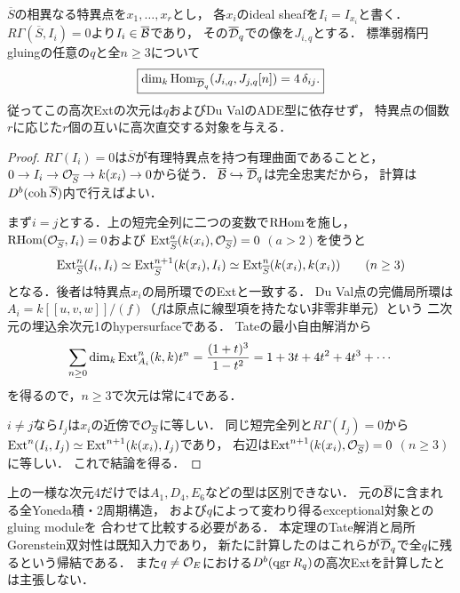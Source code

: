 \begin{theorem}[Du Val点の高次Extの一様性]\label{thm:duval-high-ext}
$\overline S$の相異なる特異点を$x_1,\ldots,x_r$とし，
各$x_i$のideal sheafを$I_i=I_{x_i}$と書く．
$R\Gamma(\overline S,I_i)=0$より$I_i\in\overline{\mathcal B}$であり，
その$\overline{\mathcal D}_q$での像を$J_{i,q}$とする．
標準弱楕円gluingの任意の$q$と全$n\ge3$について
\[
\boxed{\dim_k\operatorname{Hom}_{\overline{\mathcal D}_q}(J_{i,q},J_{j,q}[n])
 =4\,\delta_{ij}.}
\]
従ってこの高次Extの次元は$q$およびDu ValのADE型に依存せず，
特異点の個数$r$に応じた$r$個の互いに高次直交する対象を与える．
\end{theorem}
\begin{proof}
$R\Gamma(I_i)=0$は$\overline S$が有理特異点を持つ有理曲面であることと，
$0\to I_i\to\mathcal O_{\overline S}\to k(x_i)\to0$から従う．
$\overline{\mathcal B}\hookrightarrow\overline{\mathcal D}_q$は完全忠実だから，
計算は$D^b(\operatorname{coh}\overline S)$内で行えばよい．

まず$i=j$とする．上の短完全列に二つの変数で$\operatorname{RHom}$を施し，
$\operatorname{RHom}(\mathcal O_{\overline S},I_i)=0$および
$\operatorname{Ext}_{\overline S}^a(k(x_i),\mathcal O_{\overline S})=0$ $(a>2)$を使うと
\[
 \operatorname{Ext}^n_{\overline S}(I_i,I_i)
 \simeq\operatorname{Ext}^{n+1}_{\overline S}(k(x_i),I_i)
 \simeq\operatorname{Ext}^n_{\overline S}(k(x_i),k(x_i))
 \qquad(n\ge3)
\]
となる．後者は特異点$x_i$の局所環でのExtと一致する．
Du Val点の完備局所環は
$A_i=k[[u,v,w]]/(f)$（$f$は原点に線型項を持たない非零非単元）という
二次元の埋込余次元1のhypersurfaceである．
Tateの最小自由解消\cite{TateResolution}から
\[
 \sum_{n\ge0}\dim_k\operatorname{Ext}^n_{A_i}(k,k)t^n
 =\frac{(1+t)^3}{1-t^2}
 =1+3t+4t^2+4t^3+\cdots
\]
を得るので，$n\ge3$で次元は常に4である．

$i\ne j$なら$I_j$は$x_i$の近傍で$\mathcal O_{\overline S}$に等しい．
同じ短完全列と$R\Gamma(I_j)=0$から
$\operatorname{Ext}^n(I_i,I_j)\simeq\operatorname{Ext}^{n+1}(k(x_i),I_j)$であり，
右辺は$\operatorname{Ext}^{n+1}(k(x_i),\mathcal O_{\overline S})=0$ $(n\ge3)$に等しい．
これで結論を得る．
\end{proof}
\begin{remark}[局所特異点型と高次Extの限界]
上の一様な次元4だけでは$A_1,D_4,E_6$などの型は区別できない．
元の$\overline{\mathcal B}$に含まれる全Yoneda積・2周期構造，
および$q$によって変わり得るexceptional対象とのgluing moduleを
合わせて比較する必要がある．
本定理のTate解消と局所Gorenstein双対性は既知入力であり，
新たに計算したのはこれらが$\overline{\mathcal D}_q$で全$q$に残るという帰結である．
また$q\ne\mathcal O_E$における$D^b(\operatorname{qgr} R_q)$の高次Extを計算したとは主張しない．
\end{remark}

